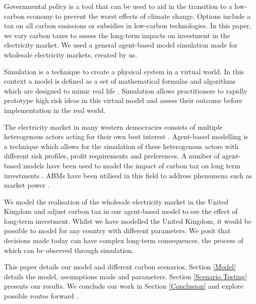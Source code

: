 
Governmental policy is a tool that can be used to aid in the transition to a low-carbon economy to prevent the worst effects of climate change. Options include a tax on all carbon emissions or subsidies in low-carbon technologies. In this paper, we vary carbon taxes to assess the long-term impacts on investment in the electricity market. We used a general agent-based model simulation made for wholesale electricity markets, created by us. 


Simulation is a technique to create a physical system in a virtual world.  In this context a model is defined as a set of mathematical formulas and algorithms which are designed to mimic real life \cite{Forshaw2016}. Simulation allows practitioners to rapidly prototype high risk ideas in this virtual model and assess their outcome before implementation in the real world.

The electricity market in many western democracies consists of multiple heterogenous actors acting for their own best interest \cite{Most2010}. Agent-based modelling is a technique which allows for the simulation of these heterogenous actors with different risk profiles, profit requirements and preferences. A number of agent-based models have been used to model the impact of carbon tax on long term investments \cite{Tang2015, Chen2014, Chappin2017}. ABMs have been utilised in this field to address phenomena such as market power \cite{Ringler2016a}.

We model the realisation of the wholesale electricity market in the United Kingdom and adjust carbon tax in our agent-based model to see the effect of long-term investment. Whilst we have modelled the United Kingdom, it would be possible to model for any country with different parameters. We posit that decisions made today can have complex long-term consequences, the process of which can be observed through simulation.



This paper details our model and different carbon scenarios. Section \ref{Model} details the model, assumptions made and parameters. Section \ref{Scenario Testing} presents our results. We conclude our work in Section \ref{Conclusion} and explore possible routes forward .


